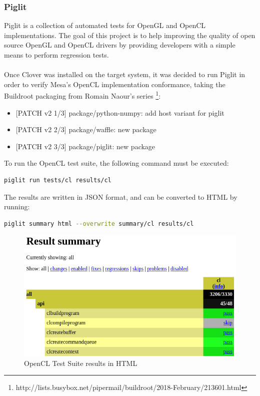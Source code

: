 \documentclass[12pt,a4paper,oneside]{article}
\begin{document}
\subsubsection*{Piglit}
Piglit is a collection of automated tests for OpenGL and OpenCL implementations.
The goal of this project is to help improving the quality of open source OpenGL and
OpenCL drivers by providing developers with a simple means to perform regression
tests.\\\\
Once Clover was installed on the target system, it was decided to run Piglit in
order to verify Mesa's OpenCL implementation conformance, taking the Buildroot
packaging from Romain Naour's series
\footnote{http://lists.busybox.net/pipermail/buildroot/2018-February/213601.html}:
\begin{itemize}
  \item {[PATCH v2 1/3]} package/python-numpy: add host variant for piglit
  \item {[PATCH v2 2/3]} package/waffle: new package
  \item {[PATCH v2 3/3]} package/piglit: new package
\end{itemize}
To run the OpenCL test suite, the following command must be executed:
\begin{lstlisting}[language=sh]
  piglit run tests/cl results/cl
\end{lstlisting}
The results are written in JSON format, and can be converted to HTML by running:
\begin{lstlisting}[language=sh]
  piglit summary html --overwrite summary/cl results/cl
\end{lstlisting}
\begin{figure}[H]
\centering
  \includegraphics[scale=0.65]{img/html_output.png}
  \caption{OpenCL Test Suite results in HTML}
  \label{fig:html_output}
\end{figure}
\end{document}
